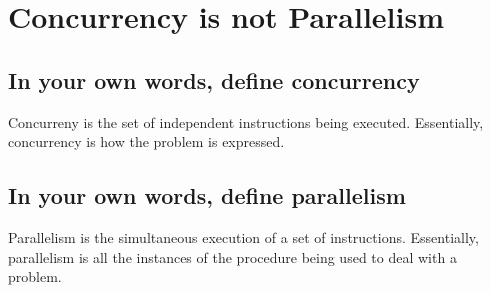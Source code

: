\documentclass[10pt,a4paper]{article}
\begin{document}
\section{Concurrency is not Parallelism}
\subsection{In your own words, define concurrency}
Concurreny is the set of independent instructions being executed. Essentially, concurrency is how the problem is expressed.
\subsection{In your own words, define parallelism}
Parallelism is the simultaneous execution of a set of instructions. Essentially, parallelism is all the instances of the procedure being used to deal with a problem.
\end{document}
